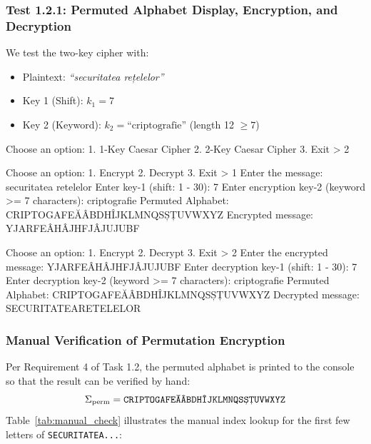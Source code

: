 \documentclass[12pt,a4paper]{article}
\begin{document}
\subsubsection{Test 1.2.1: Permuted Alphabet Display, Encryption, and Decryption}
We test the two-key cipher with:
\begin{itemize}
    \item Plaintext: \textit{``securitatea rețelelor''}
    \item Key 1 (Shift): $k_1 = 7$
    \item Key 2 (Keyword): $k_2 = \text{``criptografie''}$ (length 12 $\ge 7$)
\end{itemize}

\begin{terminalwindow}
Choose an option: 
1. 1-Key Caesar Cipher
2. 2-Key Caesar Cipher
3. Exit
> 2

Choose an option: 
1. Encrypt
2. Decrypt
3. Exit
> 1
Enter the message: securitatea retelelor
Enter key-1 (shift: 1 - 30): 7
Enter encryption key-2 (keyword >= 7 characters): criptografie
Permuted Alphabet: CRIPTOGAFEĂÂBDHÎJKLMNQSȘȚUVWXYZ
Encrypted message: YJARFEÂHÂJHFJÂJUJUBF

Choose an option: 
1. Encrypt
2. Decrypt
3. Exit
> 2
Enter the encrypted message: YJARFEÂHÂJHFJÂJUJUBF
Enter decryption key-1 (shift: 1 - 30): 7
Enter decryption key-2 (keyword >= 7 characters): criptografie
Permuted Alphabet: CRIPTOGAFEĂÂBDHÎJKLMNQSȘȚUVWXYZ
Decrypted message: SECURITATEARETELELOR
\end{terminalwindow}

\subsubsection{Manual Verification of Permutation Encryption}
Per Requirement 4 of Task 1.2, the permuted alphabet is printed to the console so that the result can be verified by hand:
\begin{equation}
    \Sigma_{\text{perm}} = \text{\texttt{CRIPTOGAFEĂÂBDHÎJKLMNQSȘȚUVWXYZ}}
\end{equation}
Table~\ref{tab:manual_check} illustrates the manual index lookup for the first few letters of \texttt{SECURITATEA...}:
\end{document}
